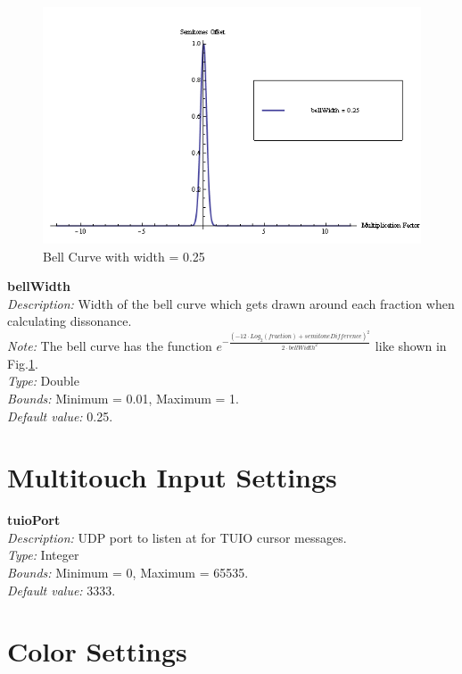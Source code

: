 \documentclass[12pt,a4paper,titlepage,oneside]{report}
\begin{document}
\begin{figure}[!ht]
\includegraphics[width=\textwidth]{images/bellcurve.png}
\centering
\caption{Bell Curve with width = 0.25}
\label{fig:bellcurve}
\end{figure}

\noindent
\textbf{bellWidth} \\
\textit{Description:} Width of the bell curve which gets drawn around each fraction when calculating dissonance. \\
\textit{Note:} The bell curve has the function $e^{- \frac{(- 12 \cdot Log_2(fraction) + semitoneDifference)^2}{2 \cdot bellWidth^2}}$ like shown in Fig.\ref{fig:bellcurve}. \\
\textit{Type:} Double \\
\textit{Bounds:} Minimum = 0.01, Maximum = 1. \\
\textit{Default value:} 0.25.


\section{Multitouch Input Settings}

\noindent
\textbf{tuioPort} \\
\textit{Description:} UDP port to listen at for TUIO cursor messages. \\
\textit{Type:} Integer \\
\textit{Bounds:} Minimum = 0, Maximum = 65535. \\
\textit{Default value:} 3333.


\section{Color Settings}
\end{document}
